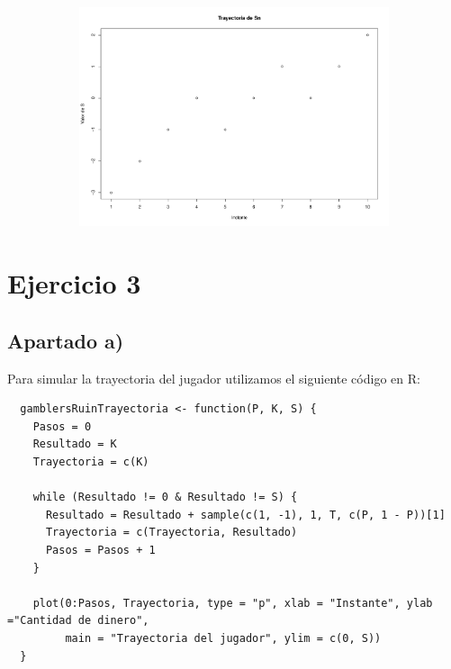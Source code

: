 \documentclass[11pt]{article}
\begin{document}
\begin{figure}[h!]
  \begin{center}
    \begin{subfigure}[b]{0.9\linewidth}
      \includegraphics[width=\linewidth]{trayectoriaS.pdf}
    \end{subfigure}
  \end{center}
\end{figure}


\section{Ejercicio 3}

\subsection*{Apartado a)}

Para simular la trayectoria del jugador utilizamos el siguiente código en R:

\begin{verbatim}
  gamblersRuinTrayectoria <- function(P, K, S) {
    Pasos = 0
    Resultado = K
    Trayectoria = c(K)
    
    while (Resultado != 0 & Resultado != S) {
      Resultado = Resultado + sample(c(1, -1), 1, T, c(P, 1 - P))[1]
      Trayectoria = c(Trayectoria, Resultado)
      Pasos = Pasos + 1
    }
    
    plot(0:Pasos, Trayectoria, type = "p", xlab = "Instante", ylab ="Cantidad de dinero",
         main = "Trayectoria del jugador", ylim = c(0, S))
  }
\end{verbatim}
\end{document}
